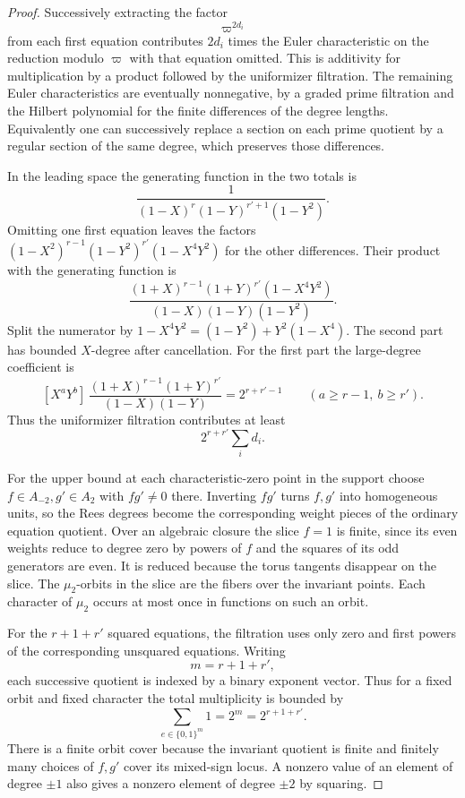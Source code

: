 \begin{proof}
Successively extracting the factor
\[
 \varpi^{2d_i}
\]
from
each first equation contributes \(2d_i\) times the Euler
characteristic on the reduction modulo \(\varpi\) with
that equation omitted. This is additivity for multiplication
by a product followed by the uniformizer filtration.
The remaining Euler characteristics are eventually
nonnegative, by a graded prime filtration and the
Hilbert polynomial for the finite differences of the
degree lengths. Equivalently one can successively replace
a section on each prime quotient by a regular section of
the same degree, which preserves those differences.

In the leading space the generating function in the two
totals is
\[
  \frac{1}{(1-X)^r(1-Y)^{r'+1}(1-Y^2)}.
\]
Omitting one first equation leaves the factors
\((1-X^2)^{r-1}(1-Y^2)^{r'}(1-X^4Y^2)\)
for the other differences. Their product with the generating
function is
\[
  \frac{(1+X)^{r-1}(1+Y)^{r'}(1-X^4Y^2)}
       {(1-X)(1-Y)(1-Y^2)}.
\]
Split the numerator by
\(1-X^4Y^2=(1-Y^2)+Y^2(1-X^4)\). The second part has
bounded \(X\)-degree after cancellation. For the first part the
large-degree coefficient is
\[
 [X^aY^b]\,\frac{(1+X)^{r-1}(1+Y)^{r'}}{(1-X)(1-Y)}
           =2^{r+r'-1}\qquad(a\ge r-1,\ b\ge r').
\]
Thus the uniformizer filtration contributes at least
\[
 2^{r+r'}\sum_i d_i.
\]


For the upper bound at each characteristic-zero point in the
support choose \(f\in A_{-2},g'\in A_2\) with \(fg'\ne0\)
there. Inverting \(fg'\) turns \(f,g'\) into homogeneous
units, so the Rees degrees become the corresponding
weight pieces of the ordinary equation quotient. Over an
algebraic closure the slice \(f=1\) is finite, since its
even weights reduce to degree zero by powers of \(f\) and
the squares of its odd generators are even. It is reduced
because the torus tangents disappear on the slice.
The \(\mu_2\)-orbits in the slice are the fibers over the
invariant points. Each character of \(\mu_2\) occurs at most
once in functions on such an orbit.

For the \(r+1+r'\) squared equations, the filtration uses
only zero and first powers of the corresponding unsquared
equations. Writing
\[
 m=r+1+r',
\]
each successive quotient is indexed by a binary exponent vector. Thus for a fixed orbit and fixed character the total multiplicity is bounded by
\[
 \sum_{e\in\{0,1\}^m}1=2^m=2^{r+1+r'} .
\]
There is a finite orbit cover because the invariant quotient
is finite and finitely many choices of \(f,g'\) cover its
mixed-sign locus. A nonzero value of an element of degree
\(\pm1\) also gives a nonzero element of degree \(\pm2\)
by squaring.


\end{proof}
